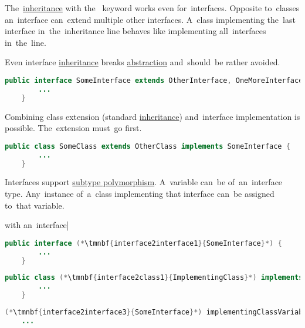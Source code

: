 \noindent The~\hyperref[inheritance]{inheritance} with the~ keyword works even for~interfaces.
Opposite to~classes an~interface can~extend multiple other interfaces.
A~class implementing the~last interface in~the~inheritance line behaves like implementing all~interfaces in~the~line.

\warning Even interface \hyperref[inheritance]{inheritance} breaks \hyperref[abstraction]{abstraction} and~should~be rather avoided.

\begin{lstlisting}[language=Java]
    public interface SomeInterface extends OtherInterface, OneMoreInterface {
        ...
    }
\end{lstlisting}
\newpage

\noindent Combining class extension (standard \hyperref[inheritance]{inheritance}) and~interface implementation is possible.
The~extension must~go first.

\begin{lstlisting}[language=Java]
    public class SomeClass extends OtherClass implements SomeInterface {
        ...
    }
\end{lstlisting}
\newline

\noindent Interfaces support \hyperref[polymorphism]{subtype polymorphism}.
A~variable can~be of~an~interface type.
Any~instance of~a~class implementing that interface can~be assigned to~that variable.

\example[\hyperref[polymorphism]{subtype polymorphism} with an~interface]
\begin{lstlisting}[language=Java, title={Some interface}]
    public interface (*\tmnbf{interface2interface1}{SomeInterface}*) {
        ...
    }
\end{lstlisting}
\begin{lstlisting}[language=Java, title={Implementing class}]
    public class (*\tmnbf{interface2class1}{ImplementingClass}*) implements (*\tmnbf{interface2interface2}{SomeInterface}*) {
        ...
    }
\end{lstlisting}
\begin{lstlisting}[language=Java, title={Usage}]
    (*\tmnbf{interface2interface3}{SomeInterface}*) implementingClassVariable = new (*\tmnbf{interface2class2}{ImplementingClass}*)();
    ...
\end{lstlisting}

